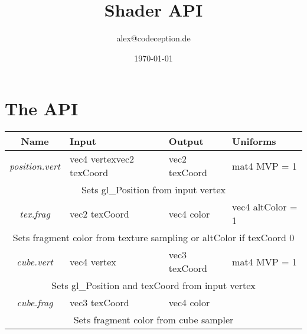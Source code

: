 \documentclass[a4paper,11pt]{article}
\title{Shader API}
\author{alex@codeception.de}
\date{\today}
\begin{document}
    
    \maketitle
    
    \section*{The API}
    \begin{tabular}{ | c | p{3cm} | p{3cm} | p{3cm} | }
        \hline
        \textbf{Name} & \textbf{Input} & \textbf{Output} & \textbf{Uniforms} \\
        \hline\hline
        \textit{position.vert} &
        vec4 vertex\newline vec2 texCoord &
        vec2 texCoord &
        mat4 MVP = 1 \\
        \hline
        \multicolumn{4}{|c|}{Sets gl\_Position from input vertex} \\
        \hline\hline
        \textit{tex.frag} &
        vec2 texCoord &
        vec4 color &
        vec4 altColor = 1 \\
        \hline
        \multicolumn{4}{|c|}{Sets fragment color from texture sampling or altColor if texCoord 0} \\
        \hline\hline
        \textit{cube.vert} &
        vec4 vertex &
        vec3 texCoord &
        mat4 MVP = 1 \\
        \hline
        \multicolumn{4}{|c|}{Sets gl\_Position and texCoord from input vertex} \\
        \hline\hline
        \textit{cube.frag} &
        vec3 texCoord &
        vec4 color &
        \\
        \hline
        \multicolumn{4}{|c|}{Sets fragment color from cube sampler} \\
        \hline
    \end{tabular}
\end{document}
